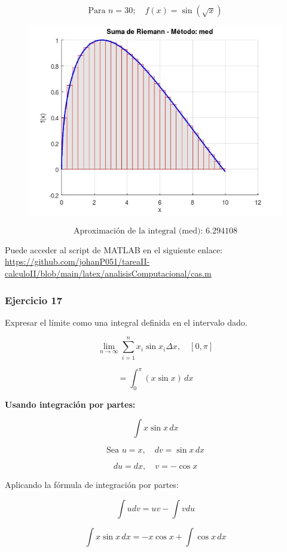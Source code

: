 \[
\text{Para } n = 30; \quad f(x) = \sin(\sqrt{x})
\]

\begin{figure}[H]
    \centering
    \includegraphics[scale=0.5]{images/3 n30.jpeg}
    \label{fig:riemann_med_n30}
\end{figure}

\[
\text{Aproximación de la integral (med): } 6.294108
\]

Puede acceder al script de MATLAB en el siguiente enlace: \url{https://github.com/johanP051/tareaII-calculoII/blob/main/latex/analisisComputacional/cas.m}

\subsubsection*{Ejercicio 17}

Expresar el límite como una integral definida en el intervalo dado.


\[
\lim_{n \to \infty} \sum_{i=1}^{n} x_i \sin x_i \Delta x, \quad [0, \pi]
\]

\[
= \int_{0}^{\pi} (x \sin x) \,dx
\]

\textbf{Usando integración por partes:}

\[
\int x \sin x \,dx
\]

\[
\text{Sea } u = x, \quad dv = \sin x \,dx
\]

\[
du = dx, \quad v = -\cos x
\]

Aplicando la fórmula de integración por partes:

\[
\int u dv = uv - \int v du
\]

\[
\int x \sin x \,dx = -x \cos x + \int \cos x \,dx
\]

